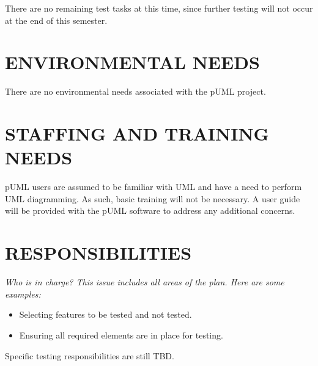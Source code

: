 \documentclass[twoside,letterpaper]{article}
\begin{document}
There are no remaining test tasks at this time, since further testing will not occur at the end of this semester.

\section[ENVIRONMENTAL NEEDS]{\bfseries ENVIRONMENTAL NEEDS}

There are no environmental needs associated with the pUML project.


\section[STAFFING AND TRAINING NEEDS]
{\bfseries STAFFING AND TRAINING NEEDS}

pUML users are assumed to be familiar with UML and have a need to perform UML diagramming. As such, basic training will not be necessary.  A user guide will be provided with the pUML software to address any additional concerns. 


\section[RESPONSIBILITIES]{\bfseries RESPONSIBILITIES}
{\itshape
Who is in charge?
This issue includes all areas of the plan. Here are some examples:
\begin{itemize}
\item Selecting features to be tested and not tested.
\item Ensuring all required elements are in place for testing. 
\end{itemize} }

Specific testing responsibilities are still TBD.
\end{document}
